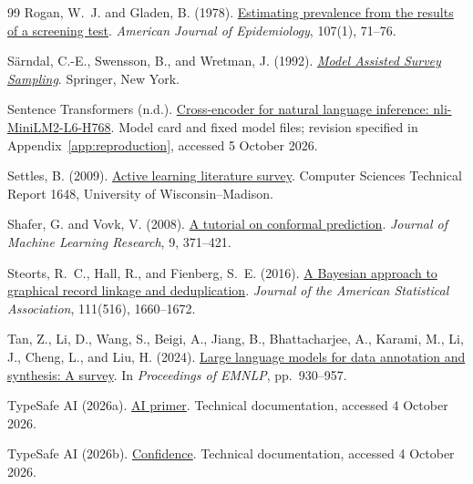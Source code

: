 \documentclass[11pt,a4paper]{article}
\begin{document}
\begin{thebibliography}{99}
Rogan, W.~J. and Gladen, B. (1978).
\href{https://doi.org/10.1093/oxfordjournals.aje.a112510}{Estimating prevalence from the results of a screening test}.
\emph{American Journal of Epidemiology}, 107(1), 71--76.

S{\"a}rndal, C.-E., Swensson, B., and Wretman, J. (1992).
\href{https://link.springer.com/book/9780387406206}{\emph{Model Assisted Survey Sampling}}.
Springer, New York.

Sentence Transformers (n.d.).
\href{https://huggingface.co/cross-encoder/nli-MiniLM2-L6-H768}{Cross-encoder for natural language inference: nli-MiniLM2-L6-H768}.
Model card and fixed model files; revision specified in Appendix~\ref{app:reproduction}, accessed 5 October 2026.

Settles, B. (2009).
\href{https://research.cs.wisc.edu/techreports/2009/TR1648.pdf}{Active learning literature survey}.
Computer Sciences Technical Report 1648, University of Wisconsin--Madison.

Shafer, G. and Vovk, V. (2008).
\href{https://jmlr.org/papers/v9/shafer08a.html}{A tutorial on conformal prediction}.
\emph{Journal of Machine Learning Research}, 9, 371--421.

Steorts, R.~C., Hall, R., and Fienberg, S.~E. (2016).
\href{https://doi.org/10.1080/01621459.2015.1105807}{A Bayesian approach to graphical record linkage and deduplication}.
\emph{Journal of the American Statistical Association}, 111(516), 1660--1672.

Tan, Z., Li, D., Wang, S., Beigi, A., Jiang, B., Bhattacharjee, A., Karami, M., Li, J., Cheng, L., and Liu, H. (2024).
\href{https://doi.org/10.18653/v1/2024.emnlp-main.54}{Large language models for data annotation and synthesis: A survey}.
In \emph{Proceedings of EMNLP}, pp.~930--957.

TypeSafe AI (2026a).
\href{https://docs.typesafe.ai/introduction/machine-learning-primer}{AI primer}.
Technical documentation, accessed 4 October 2026.

TypeSafe AI (2026b).
\href{https://docs.typesafe.ai/confidence}{Confidence}.
Technical documentation, accessed 4 October 2026.


\end{thebibliography}
\end{document}
